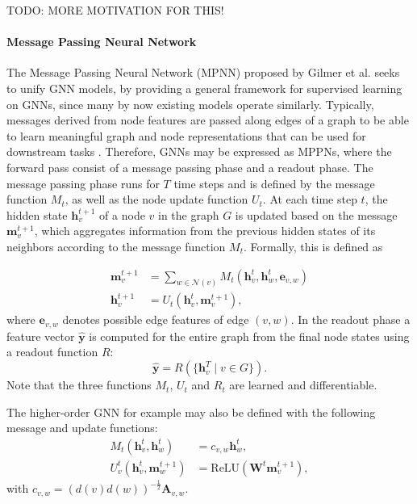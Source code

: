TODO: MORE MOTIVATION FOR THIS! \bigskip

\paragraph{Message Passing Neural Network}\par
\label{par:MPNN}
The Message Passing Neural Network (MPNN) proposed by Gilmer et al. \cite{gilmer2017neural} seeks to unify GNN models, by providing a general framework for supervised learning on GNNs, since many by now existing models operate similarly. Typically, messages derived from node features are passed along edges of a graph to be able to learn meaningful graph and node representations that can be used for downstream tasks \cite{kipf2016semi} \cite{4700287} \cite{velivckovic2017graph} \cite{xu2018powerful}. Therefore, GNNs may be expressed as MPPNs, where the forward pass consist of a message passing phase and a readout phase. The message passing phase runs for $T$ time steps and is defined by the message function $M_t$, as well as the node update function $U_t$. At each time step $t$, the hidden state $\mathbf{h}_v^{t+1}$ of a node $v$ in the graph $G$ is updated based on the message $\mathbf{m}_v^{t+1}$, which aggregates information from the previous hidden states of its neighbors according to the message function $M_t$. Formally, this is defined as

\begin{align}
    \mathbf{m}_v^{t+1} &= \sum_{w \in \mathcal{N}(v)} M_t\left(\mathbf{h}_v^t, \mathbf{h}_w^t, \mathbf{e}_{v,w}\right) \\
    \mathbf{h}_v^{t+1} &= U_t\left(\mathbf{h}_v^t, \mathbf{m}_v^{t+1}\right),
\end{align}
where $\mathbf{e}_{v,w}$ denotes possible edge features of edge $(v,w)$.
In the readout phase a feature vector $\hat{\mathbf{y}}$ is computed for the entire graph from the final node states  using a readout function $R$:
\begin{equation}
    \hat{\mathbf{y}} = R\left(\{ \mathbf{h}_v^T \mid v \in G \}\right).
\end{equation}
Note that the three functions $M_t$, $U_t$ and $R_t$ are learned and differentiable.
    
The higher-order GNN for example may also be defined with the following message and update functions:
\begin{align}
    M_t(\mathbf{h}_v^t, \mathbf{h}_w^t) &= c_{v,w}\mathbf{h}_w^t, \\
    U_v^t(\mathbf{h}_v^t, \mathbf{m}_w^{t+1}) &= \text{ReLU}(\mathbf{W}^t\mathbf{m}_v^{t+1}),
\end{align}
with $c_{v,w} = (d(v)d(w))^{-\frac{1}{2}}\mathbf{A}_{v,w}$.

